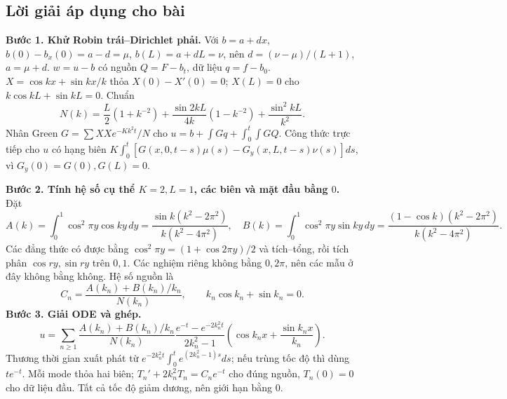 \documentclass[10pt,a4paper]{article}
\begin{document}
\subsection*{Lời giải áp dụng cho bài}
\textbf{Bước 1. Khử Robin trái–Dirichlet phải.}
Với $b=a+dx$, $b(0)-b_x(0)=a-d=\mu$, $b(L)=a+dL=\nu$, nên $d=(\nu-\mu)/(L+1)$, $a=\mu+d$. $w=u-b$ có nguồn $Q=F-b_t$, dữ liệu $q=f-b_0$.
$X=\cos kx+\sin kx/k$ thỏa $X(0)-X'(0)=0$; $X(L)=0$ cho $k\cos kL+\sin kL=0$. Chuẩn
\[N(k)=\frac L2(1+k^{-2})+\frac{\sin2kL}{4k}(1-k^{-2})+\frac{\sin^2kL}{k^2}.\]
Nhân Green $G=\sum XXe^{-Kk^2t}/N$ cho $u=b+\int Gq+\int_0^t\int GQ$. Công thức trực tiếp cho $u$ có hạng biên $K\int_0^t[G(x,0,t-s)\mu(s)-G_y(x,L,t-s)\nu(s)]ds$, vì $G_y(0)=G(0),G(L)=0$.

\textbf{Bước 2. Tính hệ số cụ thể $K=2,L=1$, các biên và mặt đầu bằng $0$.}
Đặt
\[A(k)=\int_0^1\cos^2\pi y\cos ky\,dy
=\frac{\sin k(k^2-2\pi^2)}{k(k^2-4\pi^2)},\quad
B(k)=\int_0^1\cos^2\pi y\sin ky\,dy
=\frac{(1-\cos k)(k^2-2\pi^2)}{k(k^2-4\pi^2)}.\]
Các đẳng thức có được bằng $\cos^2\pi y=(1+\cos2\pi y)/2$ và tích–tổng, rồi tích phân $\cos ry,\sin ry$ trên $0,1$. Các nghiệm riêng không bằng $0,2\pi$, nên các mẫu ở đây không bằng không. Hệ số nguồn là
\[C_n=\frac{A(k_n)+B(k_n)/k_n}{N(k_n)},\qquad k_n\cos k_n+\sin k_n=0.\]
\textbf{Bước 3. Giải ODE và ghép.}
\[u=\sum_{n\ge1}\frac{A(k_n)+B(k_n)/k_n}{N(k_n)}
\frac{e^{-t}-e^{-2k_n^2t}}{2k_n^2-1}
\left(\cos k_nx+\frac{\sin k_nx}{k_n}\right).\]
Thương thời gian xuất phát từ $e^{-2k_n^2t}\int_0^te^{(2k_n^2-1)s}ds$; nếu trùng tốc độ thì dùng $te^{-t}$. Mỗi mode thỏa hai biên; $T_n'+2k_n^2T_n=C_ne^{-t}$ cho đúng nguồn, $T_n(0)=0$ cho dữ liệu đầu. Tất cả tốc độ giảm dương, nên giới hạn bằng $0$.
\end{document}

